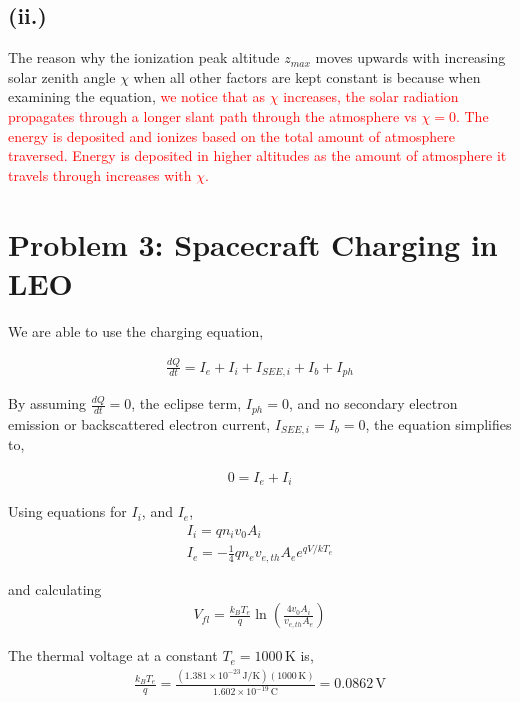 \documentclass[11pt]{article}
\begin{document}
\subsection*{(ii.)}
The reason why the ionization peak altitude $z_{max}$ moves upwards with increasing solar zenith angle
$\chi$ when all other factors are kept constant is because when examining the equation, \textcolor{red}{we notice that as $\chi$ increases,
the solar radiation propagates through a longer slant path through the atmosphere vs $\chi=0$. The energy is deposited and ionizes based on 
the total amount of atmosphere traversed. Energy is deposited in higher altitudes as the amount of atmosphere it travels through increases
with $\chi$. }


\newpage
\section*{Problem 3: Spacecraft Charging in LEO}
\hspace*{2em}We are able to use the charging equation,

\begin{gather*}
\frac{dQ}{dt} = I_e + I_i + I_{SEE,i} + I_b + I_{ph}
\end{gather*}

\hspace*{2em}By assuming $\frac{dQ}{dt} = 0$, the eclipse term, $I_{ph}=0$, 
and no secondary electron emission or backscattered electron current, $I_{SEE,i} = I_b = 0$, the equation simplifies to,

\begin{gather*}
0 = I_e + I_i
\end{gather*}

\hspace*{2em}Using equations for $I_i$, and $I_e$,
\begin{gather*}
I_i = q n_i v_{0} A_i \\
I_e = -\frac{1}{4} q n_e v_{e,th} A_e e^{qV/kT_e}
\end{gather*}

\hspace*{2em}and calculating 
\begin{gather*}
V_{fl} = \frac{k_B T_e}{q}\ln\left(\frac{4 v_0 A_i}{v_{e,th} A_e}\right)
\end{gather*}

\hspace*{2em}The thermal voltage at a constant $T_e = 1000\,\mathrm{K}$ is,
\begin{gather*}
\frac{k_B T_e}{q} = \frac{(1.381\times10^{-23}\,\mathrm{J/K})(1000\,\mathrm{K})}{1.602\times10^{-19}\,\mathrm{C}} = 0.0862\,\mathrm{V}
\end{gather*}
\end{document}
